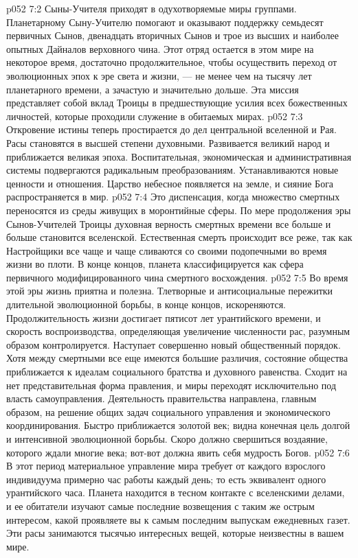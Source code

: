 \vs p052 7:2 Сыны\hyp{}Учителя приходят в одухотворяемые миры группами. Планетарному Сыну\hyp{}Учителю помогают и оказывают поддержку семьдесят первичных Сынов, двенадцать вторичных Сынов и трое из высших и наиболее опытных Дайналов верховного чина. Этот отряд остается в этом мире на некоторое время, достаточно продолжительное, чтобы осуществить переход от эволюционных эпох к эре света и жизни, --- не менее чем на тысячу лет планетарного времени, а зачастую и значительно дольше. Эта миссия представляет собой вклад Троицы в предшествующие усилия всех божественных личностей, которые проходили служение в обитаемых мирах.
\vs p052 7:3 \pc Откровение истины теперь простирается до дел центральной вселенной и Рая. Расы становятся в высшей степени духовными. Развивается великий народ и приближается великая эпоха. Воспитательная, экономическая и административная системы подвергаются радикальным преобразованиям. Устанавливаются новые ценности и отношения. Царство небесное появляется на земле, и сияние Бога распространяется в мир.
\vs p052 7:4 Это диспенсация, когда множество смертных переносятся из среды живущих в моронтийные сферы. По мере продолжения эры Сынов\hyp{}Учителей Троицы духовная верность смертных времени все больше и больше становится вселенской. Естественная смерть происходит все реже, так как Настройщики все чаще и чаще сливаются со своими подопечными во время жизни во плоти. В конце концов, планета классифицируется как сфера первичного модифицированного чина смертного восхождения.
\vs p052 7:5 \pc Во время этой эры жизнь приятна и полезна. Тлетворные и антисоциальные пережитки длительной эволюционной борьбы, в конце концов, искореняются. Продолжительность жизни достигает пятисот лет урантийского времени, и скорость воспроизводства, определяющая увеличение численности рас, разумным образом контролируется. Наступает совершенно новый общественный порядок. Хотя между смертными все еще имеются большие различия, состояние общества приближается к идеалам социального братства и духовного равенства. Сходит на нет представительная форма правления, и миры переходят исключительно под власть самоуправления. Деятельность правительства направлена, главным образом, на решение общих задач социального управления и экономического координирования. Быстро приближается золотой век; видна конечная цель долгой и интенсивной эволюционной борьбы. Скоро должно свершиться воздаяние, которого ждали многие века; вот\hyp{}вот должна явить себя мудрость Богов.
\vs p052 7:6 В этот период материальное управление мира требует от каждого взрослого индивидуума примерно час работы каждый день; то есть эквивалент одного урантийского часа. Планета находится в тесном контакте с вселенскими делами, и ее обитатели изучают самые последние возвещения с таким же острым интересом, какой проявляете вы к самым последним выпускам ежедневных газет. Эти расы занимаются тысячью интересных вещей, которые неизвестны в вашем мире.
